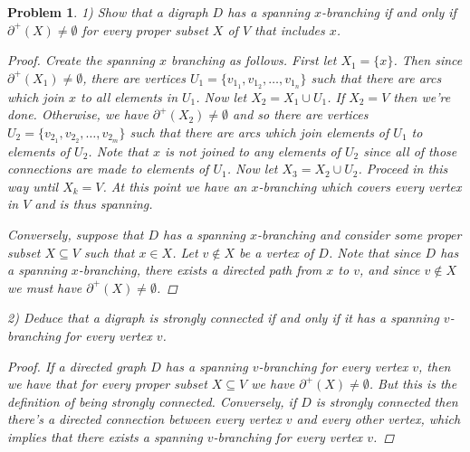 \documentclass{article}
\newtheorem{problem}{Problem}
\begin{document}
\begin{flushleft}
\begin{problem}
1) Show that a digraph $D$ has a spanning $x$-branching if and only if $\partial^+ (X) \neq \emptyset$ for every proper subset $X$ of $V$ that includes $x$.
\begin{proof}
Create the spanning $x$ branching as follows. First let $X_1 = \{x\}$. Then since $\partial^+ (X_1) \neq \emptyset$, there are vertices $U_1 = \{v_{1_1}, v_{1_2}, \dots , v_{1_n}\}$ such that there are arcs which join $x$ to all elements in $U_1$. Now let $X_2 = X_1 \cup U_1$. If $X_2 = V$ then we're done. Otherwise, we have $\partial^+ (X_2) \neq \emptyset$ and so there are vertices $U_2 = \{v_{2_1}, v_{2_2}, \dots , v_{2_m}\}$ such that there are arcs which join elements of $U_1$ to elements of $U_2$. Note that $x$ is not joined to any elements of $U_2$ since all of those connections are made to elements of $U_1$. Now let $X_3 = X_2 \cup U_2$. Proceed in this way until $X_k = V$. At this point we have an $x$-branching which covers every vertex in $V$ and is thus spanning.\newline

Conversely, suppose that $D$ has a spanning $x$-branching and consider some proper subset $X \subseteq V$ such that $x \in X$. Let $v \notin X$ be a vertex of $D$. Note that since $D$ has a spanning $x$-branching, there exists a directed path from $x$ to $v$, and since $v \notin X$ we must have $\partial^+ (X) \neq \emptyset$.
\end{proof}
2) Deduce that a digraph is strongly connected if and only if it has a spanning $v$-branching for every vertex $v$.
\begin{proof}
If a directed graph $D$ has a spanning $v$-branching for every vertex $v$, then we have that for every proper subset $X \subseteq V$ we have $\partial^+ (X) \neq \emptyset$. But this is the definition of being strongly connected. Conversely, if $D$ is strongly connected then there's a directed connection between every vertex $v$ and every other vertex, which implies that there exists a spanning $v$-branching for every vertex $v$.
\end{proof}
\end{problem}


\end{flushleft}
\end{document}
